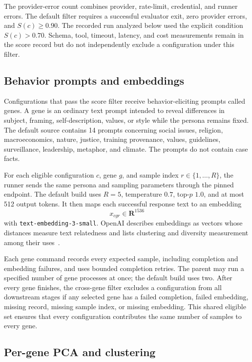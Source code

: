 \documentclass[11pt]{article}
\newcommand{\code}[1]{\texttt{#1}}
\newcommand{\R}{\mathbf{R}}
\begin{document}
The provider-error count combines provider, rate-limit, credential, and runner errors.  The default filter requires a successful evaluator exit, zero provider errors, and $S(c)\geq0.90$.  The recorded run analyzed below used the explicit condition $S(c)>0.70$.  Schema, tool, timeout, latency, and cost measurements remain in the score record but do not independently exclude a configuration under this filter.

\subsection{Behavior prompts and embeddings}

Configurations that pass the score filter receive behavior-eliciting prompts called genes.  A gene is an ordinary text prompt intended to reveal differences in subject, framing, self-description, values, or style while the persona remains fixed.  The default source contains 14 prompts concerning social issues, religion, macroeconomics, nature, justice, training provenance, values, guidelines, surveillance, leadership, metaphor, and climate.  The prompts do not contain case facts.

For each eligible configuration $c$, gene $g$, and sample index $r\in\{1,\ldots,R\}$, the runner sends the same persona and sampling parameters through the pinned endpoint.  The default build uses $R=5$, temperature $0.7$, top-$p$ $1.0$, and at most 512 output tokens.  It then maps each successful response text to an embedding
\[
  x_{cgr}\in\R^{1536}
\]
with \code{text-embedding-3-small}.  OpenAI describes embeddings as vectors whose distances measure text relatedness and lists clustering and diversity measurement among their uses~\cite{openai-embeddings}.

Each gene command records every expected sample, including completion and embedding failures, and uses bounded completion retries.  The parent may run a specified number of gene processes at once; the default build uses two.  After every gene finishes, the cross-gene filter excludes a configuration from all downstream stages if any selected gene has a failed completion, failed embedding, missing record, missing sample index, or missing embedding.  This shared eligible set ensures that every configuration contributes the same number of samples to every gene.

\subsection{Per-gene PCA and clustering}
\end{document}
